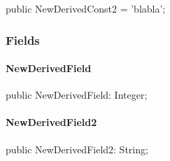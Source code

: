 \documentclass{report}
\begin{document}
\begin{list}{}{
\setlength{\itemindent}{0cm}
\setlength{\listparindent}{0cm}
\setlength{\leftmargin}{\evensidemargin}
\addtolength{\leftmargin}{\tmplength}
\settowidth{\labelsep}{X}
\addtolength{\leftmargin}{\labelsep}
\setlength{\labelwidth}{\tmplength}
}
\begin{flushleft}
\item[\textbf{Declaration}\hfill]
\begin{ttfamily}
public NewDerivedConst2 = 'blabla';\end{ttfamily}


\end{flushleft}
\end{list}
\subsubsection*{\large{\textbf{Fields}}\normalsize\hspace{1ex}\hfill}
\paragraph*{NewDerivedField}\hspace*{\fill}

\begin{list}{}{
\setlength{\itemindent}{0cm}
\setlength{\listparindent}{0cm}
\setlength{\leftmargin}{\evensidemargin}
\addtolength{\leftmargin}{\tmplength}
\settowidth{\labelsep}{X}
\addtolength{\leftmargin}{\labelsep}
\setlength{\labelwidth}{\tmplength}
}
\begin{flushleft}
\item[\textbf{Declaration}\hfill]
\begin{ttfamily}
public NewDerivedField: Integer;\end{ttfamily}


\end{flushleft}
\end{list}
\paragraph*{NewDerivedField2}\hspace*{\fill}

\begin{list}{}{
\setlength{\itemindent}{0cm}
\setlength{\listparindent}{0cm}
\setlength{\leftmargin}{\evensidemargin}
\addtolength{\leftmargin}{\tmplength}
\settowidth{\labelsep}{X}
\addtolength{\leftmargin}{\labelsep}
\setlength{\labelwidth}{\tmplength}
}
\begin{flushleft}
\item[\textbf{Declaration}\hfill]
\begin{ttfamily}
public NewDerivedField2: String;\end{ttfamily}


\end{flushleft}
\end{list}
\end{document}
